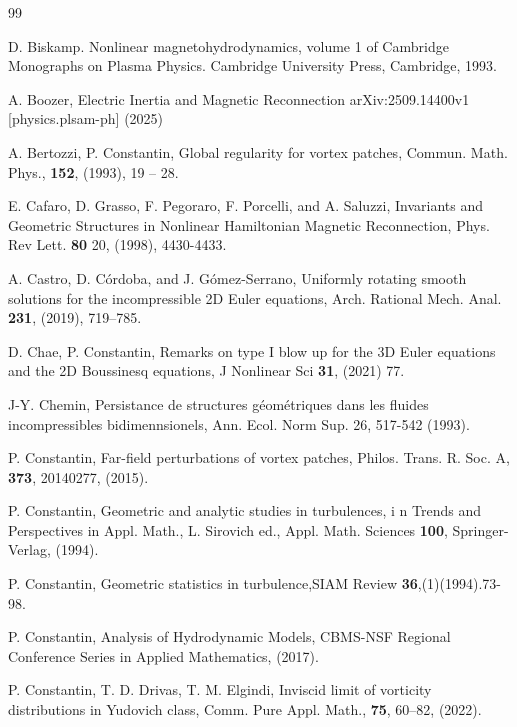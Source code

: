 \documentclass[11pt,reqno]{amsproc}
\begin{document}
\begin{thebibliography}{99}


 D. Biskamp. Nonlinear magnetohydrodynamics, volume 1 of Cambridge Monographs on Plasma Physics. Cambridge University Press, Cambridge, 1993.
 
  A. Boozer, Electric Inertia and Magnetic Reconnection arXiv:2509.14400v1 [physics.plsam-ph] (2025)
 
  A. Bertozzi, P. Constantin, Global regularity for vortex patches, Commun. Math. Phys., {\bf 152}, (1993), 19 -- 28.
 
 E. Cafaro, D. Grasso, F. Pegoraro, F. Porcelli, and A. Saluzzi, Invariants and Geometric Structures in Nonlinear Hamiltonian Magnetic Reconnection, Phys. Rev Lett. {\bf{80}} 20, (1998), 4430-4433.

 A. Castro, D. Córdoba, and J. Gómez-Serrano, Uniformly rotating smooth solutions for the incompressible 2D Euler equations, Arch. Rational Mech. Anal. {\bf{231}}, (2019), 719–785.

 D. Chae, P. Constantin, Remarks on type I blow up for the 3D Euler equations and the 2D Boussinesq equations, J Nonlinear Sci {\bf 31},  (2021) 77. 

 J-Y. Chemin,  Persistance de structures g\'{e}om\'{e}triques dans les fluides incompressibles bidimennsionels, Ann. Ecol. Norm Sup. 26, 517-542 (1993).

 P. Constantin, Far-field perturbations of vortex patches, Philos. Trans. R. Soc. A, {\bf 373}, 20140277, (2015).

 P. Constantin, Geometric and analytic studies in turbulences, i
n Trends and Perspectives in Appl. Math., L. Sirovich ed., Appl. Math. Sciences 
{\bf 100}, Springer-Verlag, (1994).

 P. Constantin, Geometric statistics in turbulence,SIAM Review {\bf
 36},(1)(1994).73-98. 
 

 P. Constantin, Analysis of Hydrodynamic Models, CBMS-NSF Regional Conference Series in Applied Mathematics, (2017).

 P. Constantin, T. D. Drivas, T. M. Elgindi, Inviscid limit of vorticity distributions in Yudovich class, Comm. Pure Appl. Math., {\bf 75}, 60–82, (2022).


\end{thebibliography}
\end{document}
